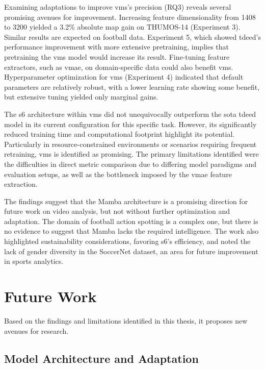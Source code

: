 Examining adaptations to improve \acrshort{vms}'s precision (RQ3) reveals several promising avenues for improvement. Increasing feature dimensionality from 1408 to 3200 yielded a 3.2\% absolute \acrshort{map} gain on THUMOS-14 (Experiment 3). Similar results are expected on football data. Experiment 5, which showed \acrshort{tdeed}'s performance improvement with more extensive pretraining, implies that pretraining the \acrshort{vms} model would increase its result. Fine-tuning feature extractors, such as \acrshort{vmae}, on domain-specific data could also benefit \acrshort{vms}. Hyperparameter optimization for \acrshort{vms} (Experiment 4) indicated that default parameters are relatively robust, with a lower learning rate showing some benefit, but extensive tuning yielded only marginal gains.

The \acrshort{s6} architecture within \acrshort{vms} did not unequivocally outperform the \acrshort{sota} \acrshort{tdeed} model in its current configuration for this specific task. However, its significantly reduced training time and computational footprint highlight its potential. Particularly in resource-constrained environments or scenarios requiring frequent retraining, \acrshort{vms} is identified as promising. The primary limitations identified were the difficulties in direct metric comparison due to differing model paradigms and evaluation setups, as well as the bottleneck imposed by the \acrshort{vmae} feature extraction.

The findings suggest that the Mamba architecture is a promising direction for future work on video analysis, but not without further optimization and adaptation. The domain of football action spotting is a complex one, but there is no evidence to suggest that Mamba lacks the required intelligence. The work also highlighted sustainability considerations, favoring \acrshort{s6}'s efficiency, and noted the lack of gender diversity in the SoccerNet dataset, an area for future improvement in sports analytics.


\section{Future Work}
\label{sec:future_work}
Based on the findings and limitations identified in this thesis, it proposes new avenues for research. 

\subsection{Model Architecture and Adaptation}

